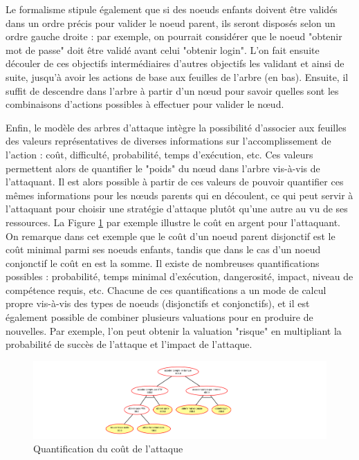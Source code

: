         Le formalisme stipule également que si des noeuds enfants doivent être validés dans un ordre précis pour valider le noeud parent, ils seront disposés selon un ordre gauche droite : par exemple, on pourrait considérer que le noeud "obtenir mot de passe" doit être validé avant celui "obtenir login". L'on fait ensuite découler de ces objectifs intermédiaires d'autres objectifs les validant et ainsi de suite, jusqu'à avoir les actions de base aux feuilles de l'arbre (en bas). Ensuite, il suffit de descendre dans l'arbre à partir d'un nœud pour savoir quelles sont les combinaisons d'actions possibles à effectuer pour valider le nœud.

        Enfin, le modèle des arbres d'attaque intègre la possibilité d'associer aux feuilles des valeurs représentatives de diverses informations sur l'accomplissement de l'action : coût, difficulté, probabilité, temps d'exécution, etc. Ces valeurs permettent alors de quantifier le "poids" du nœud dans l'arbre vis-à-vis de l'attaquant. Il est alors possible à partir de ces valeurs de pouvoir quantifier ces mêmes informations pour les nœuds parents qui en découlent, ce qui peut servir à l'attaquant pour choisir une stratégie d'attaque plutôt qu'une autre au vu de ses ressources. La Figure \ref{fig:arbre_exemple_2} par exemple illustre le coût en argent pour l'attaquant. On remarque dans cet exemple que le coût d'un noeud parent disjonctif est le coût minimal parmi ses noeuds enfants, tandis que dans le cas d'un noeud conjonctif le coût en est la somme. Il existe de nombreuses quantifications possibles : probabilité, temps minimal d'exécution, dangerosité, impact, niveau de compétence requis, etc. Chacune de ces quantifications a un mode de calcul propre vis-à-vis des types de noeuds (disjonctifs et conjonctifs), et il est également possible de combiner plusieurs valuations pour en produire de nouvelles. Par exemple, l'on peut obtenir la valuation "risque" en multipliant la probabilité de succès de l'attaque et l'impact de l'attaque.

        \begin{figure}[htbp]
	        \centering
	        \includegraphics[width=\textwidth]{figure/quantification.pdf}%
	        \caption{Quantification du coût de l'attaque}
	        \label{fig:arbre_exemple_2}
        \end{figure}

